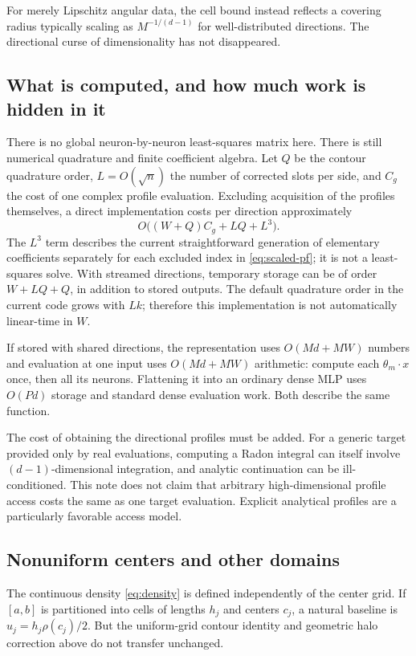 \documentclass[11pt]{article}
\begin{document}
For merely Lipschitz angular data, the cell bound instead reflects a covering radius typically scaling as $M^{-1/(d-1)}$ for well-distributed directions. The directional curse of dimensionality has not disappeared.

\subsection{What is computed, and how much work is hidden in it}

There is no global neuron-by-neuron least-squares matrix here. There is still numerical quadrature and finite coefficient algebra. Let $Q$ be the contour quadrature order, $L=O(\sqrt n)$ the number of corrected slots per side, and $C_g$ the cost of one complex profile evaluation. Excluding acquisition of the profiles themselves, a direct implementation costs per direction approximately
\[
 O\big((W+Q)C_g+LQ+L^3\big).
\]
The $L^3$ term describes the current straightforward generation of elementary coefficients separately for each excluded index in \eqref{eq:scaled-pf}; it is not a least-squares solve. With streamed directions, temporary storage can be of order $W+LQ+Q$, in addition to stored outputs. The default quadrature order in the current code grows with $Lk$; therefore this implementation is not automatically linear-time in $W$.

If stored with shared directions, the representation uses $O(Md+MW)$ numbers and evaluation at one input uses $O(Md+MW)$ arithmetic: compute each $\theta_m\cdot x$ once, then all its neurons. Flattening it into an ordinary dense MLP uses $O(Pd)$ storage and standard dense evaluation work. Both describe the same function.

The cost of obtaining the directional profiles must be added. For a generic target provided only by real evaluations, computing a Radon integral can itself involve $(d-1)$-dimensional integration, and analytic continuation can be ill-conditioned. This note does not claim that arbitrary high-dimensional profile access costs the same as one target evaluation. Explicit analytical profiles are a particularly favorable access model.

\subsection{Nonuniform centers and other domains}

The continuous density \eqref{eq:density} is defined independently of the center grid. If $[a,b]$ is partitioned into cells of lengths $h_j$ and centers $c_j$, a natural baseline is $u_j=h_j\rho(c_j)/2$. But the uniform-grid contour identity and geometric halo correction above do not transfer unchanged.
\end{document}
